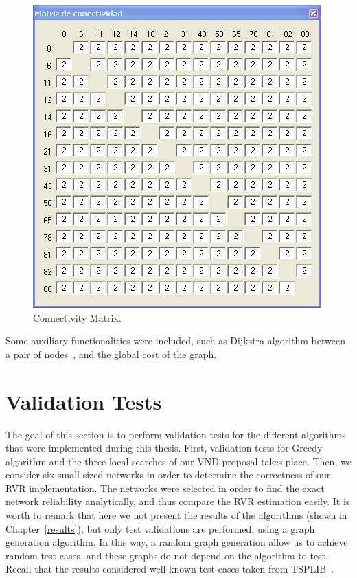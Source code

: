 \begin{figure}[H]
\begin{center}
\includegraphics[scale=0.7]{10.jpg}
\caption{Connectivity Matrix.}\label{App-6}
\end{center} 
\end{figure}
Some auxiliary functionalities were included, such as Dijkstra algorithm between a pair of nodes~\cite{20}, 
and the global cost of the graph.

\section{Validation Tests}
The goal of this section is to perform validation tests for the different algorithms that were implemented during this thesis. First, validation tests for Greedy algorithm and the three local searches of our VND proposal takes place. Then, we consider six small-sized networks in order to determine the correctness of our RVR implementation. 
The networks were selected in order to find the exact network reliability analytically, and thus compare the 
RVR estimation easily. It is worth to remark that here we not present the results of the algorithms (shown in Chapter~\ref{results}), but only test validations are performed, using a graph generation algorithm. In this way, a random graph generation allow us to achieve random test cases, and these graphs do not depend on the 
algorithm to test. Recall that the results considered well-known test-cases taken from TSPLIB~\cite{24}.


